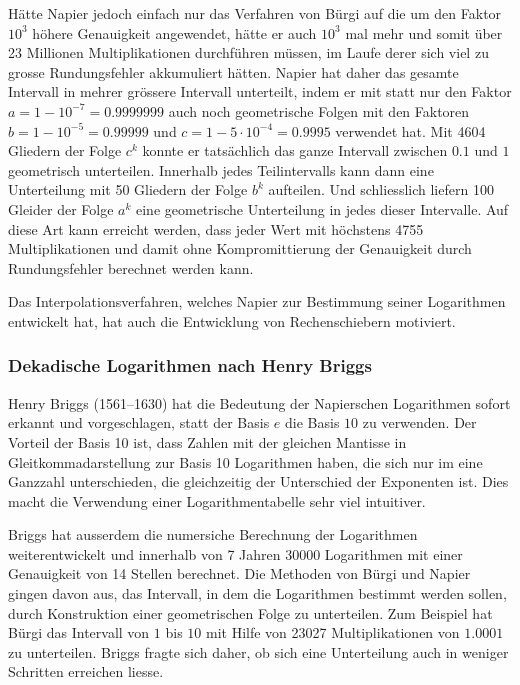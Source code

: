 Hätte Napier jedoch einfach nur das Verfahren von Bürgi auf die um
den Faktor $10^3$ höhere Genauigkeit angewendet, hätte er auch $10^3$
mal mehr und somit über 23 Millionen Multiplikationen durchführen
müssen, im Laufe derer sich viel zu grosse Rundungsfehler akkumuliert
hätten.
Napier hat daher das gesamte Intervall in mehrer grössere Intervall
unterteilt, indem er mit statt nur den Faktor $a=1-10^{-7}=0.9999999$
auch noch geometrische Folgen mit den Faktoren $b=1-10^{-5}=0.99999$ und
$c=1-5\cdot10^{-4}=0.9995$ verwendet hat.
Mit 4604 Gliedern der Folge $c^k$ konnte er tatsächlich das ganze
Intervall zwischen $0.1$ und $1$ geometrisch unterteilen.
Innerhalb jedes Teilintervalls kann dann eine Unterteilung mit
50 Gliedern der Folge $b^k$ aufteilen.
Und schliesslich liefern 100 Gleider der Folge $a^k$ eine geometrische
Unterteilung in jedes dieser Intervalle.
Auf diese Art kann erreicht werden, dass jeder Wert mit höchstens 4755
Multiplikationen und damit ohne Kompromittierung der Genauigkeit durch
Rundungsfehler berechnet werden kann.

Das Interpolationsverfahren, welches Napier zur Bestimmung seiner 
Logarithmen entwickelt hat, hat auch die Entwicklung von Rechenschiebern
motiviert.

\subsubsection{Dekadische Logarithmen nach Henry Briggs}
Henry Briggs (1561--1630) hat die Bedeutung der Napierschen
Logarithmen sofort erkannt und vorgeschlagen, statt der Basis $e$
die Basis $10$ zu verwenden. 
Der Vorteil der Basis 10 ist, dass Zahlen mit der gleichen
Mantisse in Gleitkommadarstellung zur Basis 10 Logarithmen haben,
die sich nur im eine Ganzzahl unterschieden, die gleichzeitig der
Unterschied der Exponenten ist.
Dies macht die Verwendung einer Logarithmentabelle sehr viel
intuitiver.

Briggs hat ausserdem die numersiche Berechnung der Logarithmen 
weiterentwickelt und innerhalb von 7 Jahren 30000 Logarithmen mit
einer Genauigkeit von 14 Stellen berechnet.
Die Methoden von Bürgi und Napier gingen davon aus, das Intervall,
in dem die Logarithmen bestimmt werden sollen, durch Konstruktion
einer geometrischen Folge zu unterteilen.
Zum Beispiel hat Bürgi das Intervall von $1$ bis $10$ mit Hilfe von
23027 Multiplikationen von $1.0001$ zu unterteilen.
Briggs fragte sich daher, ob sich eine Unterteilung auch in weniger
Schritten erreichen liesse.

